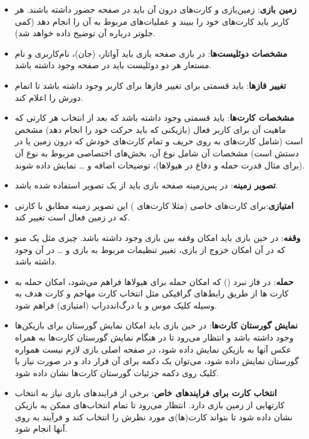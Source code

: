 \documentclass[]{article}
\begin{document}
\begin{itemize}
    \item \textbf{زمین بازی}:
     زمین‌بازی و کارت‌های درون آن باید در صفحه حضور داشته باشند. هر کاربر باید کارت‌های خود را ببیند و عملیات‌های مربوط به آن را انجام دهد (کمی جلوتر درباره آن توضیح داده خواهد شد).
    \item \textbf{مشخصات دوئلیست‌ها}:
     در بازی صفحه بازی باید آواتار،  (جان)، نام‌کاربری و نام مستعار هر دو دوئلیست باید در صفحه وجود داشته باشد.
    \item \textbf{تغییر فازها}:
     باید قسمتی برای تغییر فازها برای کاربر وجود داشته باشد تا اتمام دورش را اعلام کند.
     
    \item \textbf{مشخصات کارت‌ها}:
     باید قسمتی وجود داشته باشد که بعد از انتخاب هر کارتی که ماهیت آن برای کاربر فعال (بازیکنی که باید حرکت خود را انجام دهد) مشخص است (شامل کارت‌های به روی حریف و تمام کارت‌های خودش که درون زمین یا در دستش است) مشخصات آن شامل نوع آن، بخش‌های اختصاصی مربوط به نوع آن (برای مثال قدرت حمله و دفاع در هیولاها)، توضیحات اضافه و … نمایش داده شوند.
    \item \textbf{تصویر زمینه}:
     در پس‌زمینه صفحه بازی باید از یک تصویر استفاده شده باشد.
    \item \textbf{امتیازی}:برای کارت‌های خاصی (مثلا کارت‌های ) این تصویر زمینه مطابق با کارتی که در زمین فعال است تغییر کند.
    
    \item \textbf{وقفه}: در حین بازی باید امکان وقفه بین بازی وجود داشته باشد. چیزی مثل یک منو  که در آن امکان خروج از بازی، تغییر تنظیمات مربوط به بازی و … در آن وجود داشته باشد.
    \item \textbf{حمله}: در فاز نبرد () که امکان حمله برای هیولاها فراهم می‌شود، امکان حمله به کارت ها از طریق رابط‌های گرافیکی مثل انتخاب کارت مهاجم و کارت هدف به وسیله کلیک موس و یا درگ‌اند‌دراپ (امتیازی) فراهم شود.
    
    \item \textbf{نمایش گورستان کارت‌ها}: در حین بازی باید امکان نمایش گورستان برای بازیکن‌ها وجود داشته باشد و انتظار می‌رود تا در هنگام نمایش گورستان کارت‌ها به همراه عکس آنها به بازیکن نمایش داده شود، در صفحه اصلی بازی لازم نیست همواره گورستان نمایش داده شود، می‌توان یک دکمه برای آن قرار داد و در صورت نیاز با کلیک روی دکمه جزئیات گورستان کارت‌ها نشان داده شود.
    
    
    \item \textbf{انتخاب کارت برای فرایندهای خاص}: برخی از فرایندهای بازی نیاز به انتخاب کارتهایی از زمین بازی دارد. انتظار می‌رود تا تمام انتخاب‌های ممکن به بازیکن نشان داده شود تا بتواند کارت(ها)ی مورد نظرش را انتخاب کند و فرآیند به روی آنها انجام شود.
    

\end{itemize}
\end{document}
